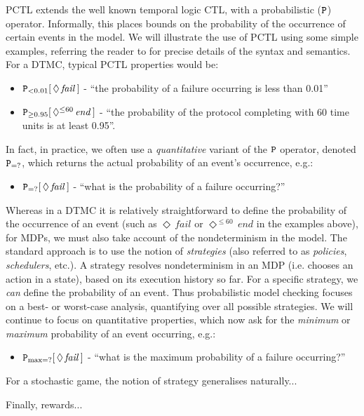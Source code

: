 \documentclass{llncs}
\newcommand{\dave}[1]{{\color{red}{[D: \sf #1]}}}
\begin{document}
PCTL extends the well known temporal logic CTL, with a probabilistic ($\tt P$) operator.
Informally, this places bounds on the probability of the occurrence of certain events in the model.
We will illustrate the use of PCTL using some simple examples,
referring the reader to \cite{HJ94,KNP07a} for precise details of the syntax and semantics.
For a DTMC, typical PCTL properties would be:
\begin{itemize}
\item ${\tt P}_{<0.01}[\,\Diamond\,\mathit{fail}\,]$ -
``the probability of a failure occurring is less than 0.01''
\item ${\tt P}_{\geq 0.95}[\,\Diamond^{\leq 60}\,\mathit{end}\,]$ -
``the probability of the protocol completing with 60 time units is at least 0.95''.
\end{itemize}
In fact, in practice, we often use a \emph{quantitative} variant of the ${\tt P}$ operator,
denoted ${\tt P}_{=?}$, which returns the actual probability of an event's occurrence, e.g.:
\begin{itemize}
\item ${\tt P}_{=?}[\,\Diamond\,\mathit{fail}\,]$ -
``what is the probability of a failure occurring?''
\end{itemize}
Whereas in a DTMC it is relatively straightforward to define the probability of the occurrence
of an event (such as $\Diamond\,\mathit{fail}$ or $\Diamond^{\leq 60}\,\mathit{end}$ in the examples above),
for MDPs, we must also take account of the nondeterminism in the model.
The standard approach is to use the notion of
\emph{strategies} (also referred to as \emph{policies}, \emph{schedulers}, etc.).
A strategy resolves nondeterminism in an MDP (i.e. chooses an action in a state),
based on its execution history so far.
For a specific strategy, we \emph{can} define the probability of an event.
Thus probabilistic model checking focuses on a best- or worst-case analysis,
quantifying over all possible strategies.
We will continue to focus on quantitative properties,
which now ask for the \emph{minimum} or \emph{maximum} probability of an event occurring, e.g.:
\begin{itemize}
\item ${\tt P}_{\max=?}[\,\Diamond\,\mathit{fail}\,]$ -
``what is the maximum probability of a failure occurring?''
\end{itemize}
For a stochastic game, the notion of strategy generalises naturally...

Finally, rewards...

\dave{mention alg.s, complexity}
\end{document}
